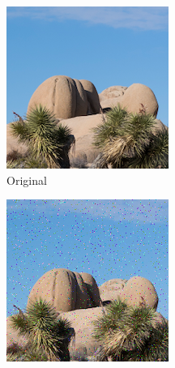 \documentclass{article}
\begin{document}
\begin{figure}[htb]
    \centering
    \begin{subfigure}[b]{0.32\textwidth}
        \centering
        \includegraphics[width=\textwidth]{../Resource/cropped-image.png}
        \caption{Original}
        \label{fig:cropped-image-cyclic-bsc-original}
    \end{subfigure}
    \hfill
    \begin{subfigure}[b]{0.32\textwidth}
        \centering
        \includegraphics[width=\textwidth]{../Result/Cyclic/15-11/cropped-cyclic-bsc-output.png}

\end{subfigure}
\end{figure}
\end{document}
